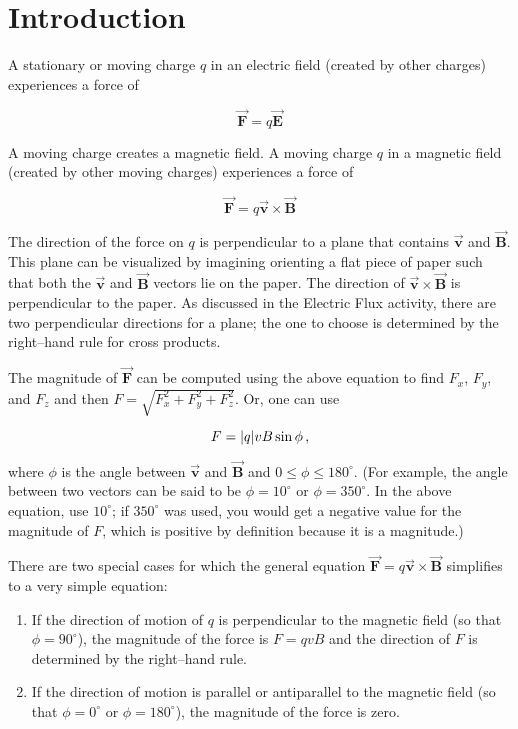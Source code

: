 \documentclass{article}
\newcommand{\bfvec}[1]{\vec{\mathbf{#1}}}
\begin{document}
\section{Introduction}

A stationary or moving charge $q$ in an electric field (created by other charges) experiences a force of

\begin{equation}
\bfvec{F} = q\bfvec{E}
\end{equation}

A moving charge creates a magnetic field. A moving charge $q$ in a magnetic field (created by other moving charges) experiences a force of

\begin{equation}
\bfvec{F} = q\bfvec{v}\times\bfvec{B}
\end{equation}

The direction of the force on $q$ is perpendicular to a plane that contains $\bfvec{v}$ and $\bfvec{B}$. This plane can be visualized by imagining orienting a flat piece of paper such that both the  $\bfvec{v}$ and $\bfvec{B}$ vectors lie on the paper. The direction of $\bfvec{v}\times\bfvec{B}$ is perpendicular to the paper. As discussed in the Electric Flux activity, there are two perpendicular directions for a plane; the one to choose is determined by the right--hand rule for cross products.

The magnitude of $\bfvec{F}$ can be computed using the above equation to find $F_x$, $F_y$, and $F_z$ and then $F=\sqrt{F_x^2+F_y^2+F_z^2}$. Or, one can use

\begin{equation}
F = |q|vB\sin\phi\thinspace,
\end{equation}

where $\phi$ is the angle between $\bfvec{v}$ and $\bfvec{B}$ and $0 \le\phi \le 180^{\circ}$. (For example, the angle between two vectors can be said to be $\phi=10^{\circ}$ or $\phi=350^{\circ}$. In the above equation, use $10^{\circ}$; if $350^{\circ}$ was used, you would get a negative value for the magnitude of $F$, which is positive by definition because it is a magnitude.)

There are two special cases for which the general equation $\bfvec{F} = q\bfvec{v}\times\bfvec{B}$ simplifies to a very simple equation:

\begin{enumerate}

  \item If the direction of motion of $q$ is perpendicular to the magnetic field (so that $\phi = 90^{\circ}$), the magnitude of the force is $F = qvB$ and the direction of $F$ is determined by the right--hand rule.

  \item If the direction of motion is parallel or antiparallel to the magnetic field (so that $\phi = 0^{\circ}$ or $\phi = 180^{\circ}$), the magnitude of the force is zero.

\end{enumerate}
\end{document}
